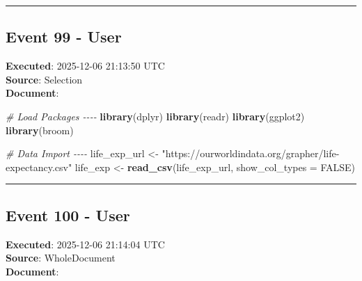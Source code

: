 \documentclass[
  11pt,
]{article}
\newenvironment{Shaded}{\begin{snugshade}}{\end{snugshade}}
\newcommand{\AttributeTok}[1]{\textcolor[rgb]{0.13,0.29,0.53}{#1}}
\newcommand{\CommentTok}[1]{\textcolor[rgb]{0.56,0.35,0.01}{\textit{#1}}}
\newcommand{\ConstantTok}[1]{\textcolor[rgb]{0.56,0.35,0.01}{#1}}
\newcommand{\FunctionTok}[1]{\textcolor[rgb]{0.13,0.29,0.53}{\textbf{#1}}}
\newcommand{\NormalTok}[1]{#1}
\newcommand{\OtherTok}[1]{\textcolor[rgb]{0.56,0.35,0.01}{#1}}
\newcommand{\StringTok}[1]{\textcolor[rgb]{0.31,0.60,0.02}{#1}}
\begin{document}
\begin{center}\rule{0.5\linewidth}{0.5pt}\end{center}

\subsection{Event 99 - User}\label{event-99---user}

\textbf{Executed}: 2025-12-06 21:13:50 UTC\\
\textbf{Source}: Selection\\
\textbf{Document}:

\begin{Shaded}
\begin{Highlighting}[]
\CommentTok{\# Load Packages {-}{-}{-}{-}}
\FunctionTok{library}\NormalTok{(dplyr)}
\FunctionTok{library}\NormalTok{(readr)}
\FunctionTok{library}\NormalTok{(ggplot2)}
\FunctionTok{library}\NormalTok{(broom)}

\CommentTok{\# Data Import {-}{-}{-}{-}}
\NormalTok{life\_exp\_url }\OtherTok{\textless{}{-}} \StringTok{"https://ourworldindata.org/grapher/life{-}expectancy.csv"}
\NormalTok{life\_exp }\OtherTok{\textless{}{-}} \FunctionTok{read\_csv}\NormalTok{(life\_exp\_url, }\AttributeTok{show\_col\_types =} \ConstantTok{FALSE}\NormalTok{)}
\end{Highlighting}
\end{Shaded}

\begin{center}\rule{0.5\linewidth}{0.5pt}\end{center}

\subsection{Event 100 - User}\label{event-100---user}

\textbf{Executed}: 2025-12-06 21:14:04 UTC\\
\textbf{Source}: WholeDocument\\
\textbf{Document}:
\end{document}
